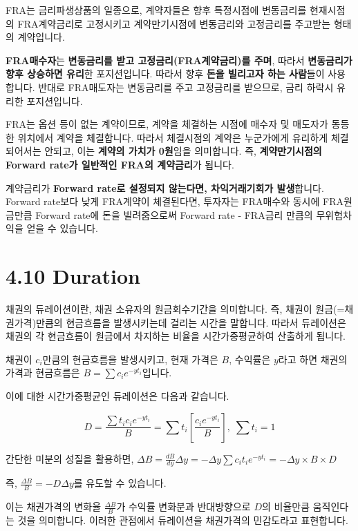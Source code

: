 \documentclass[
  letterpaper,
  DIV=11,
  numbers=noendperiod]{scrreprt}
\begin{document}

FRA는 금리파생상품의 일종으로, 계약자들은 향후 특정시점에 변동금리를
현재시점의 FRA계약금리로 고정시키고 계약만기시점에 변동금리와 고정금리를
주고받는 형태의 계약입니다.

\textbf{FRA매수자}는 \textbf{변동금리를 받고 고정금리(FRA계약금리)를
주며}, 따라서 \textbf{변동금리가 향후 상승하면 유리}한 포지션입니다.
따라서 향후 \textbf{돈을 빌리고자 하는 사람}들이 사용합니다. 반대로
FRA매도자는 변동금리를 주고 고정금리를 받으므로, 금리 하락시 유리한
포지션입니다.

FRA는 옵션 등이 없는 계약이므로, 계약을 체결하는 시점에 매수자 및
매도자가 동등한 위치에서 계약을 체결합니다. 따라서 체결시점의 계약은
누군가에게 유리하게 체결되어서는 안되고, 이는 \textbf{계약의 가치가
0원}임을 의미합니다. 즉, \textbf{계약만기시점의 Forward rate가 일반적인
FRA의 계약금리}가 됩니다.

계약금리가 \textbf{Forward rate로 설정되지 않는다면, 차익거래기회가
발생}합니다. Forward rate보다 낮게 FRA계약이 체결된다면, 투자자는
FRA매수와 동시에 FRA원금만큼 Forward rate에 돈을 빌려줌으로써 Forward
rate - FRA금리 만큼의 무위험차익을 얻을 수 있습니다.

\section*{4.10 Duration}\label{duration}


채권의 듀레이션이란, 채권 소유자의 원금회수기간을 의미합니다. 즉, 채권이
원금(=채권가격)만큼의 현금흐름을 발생시키는데 걸리는 시간을 말합니다.
따라서 듀레이션은 채권의 각 현금흐름이 원금에서 차지하는 비율을
시간가중평균하여 산출하게 됩니다.

채권이 \(c_i\)만큼의 현금흐름을 발생시키고, 현재 가격은 \(B\), 수익률은
\(y\)라고 하면 채권의 가격과 현금흐름은 \(B=\sum c_ie^{-yt_i}\)입니다.

이에 대한 시간가중평균인 듀레이션은 다음과 같습니다.

\[D=\frac{\sum t_ic_ie^{-yt_i}}{B}=\sum t_i[\frac{c_ie^{-yt_i}}{B}],\; \sum t_i=1\]

간단한 미분의 성질을 활용하면,
\(\Delta B=\frac{dB}{dy}\Delta y=-\Delta y \sum c_it_ie^{-yt_i}=-\Delta y\times B\times D\)

즉, \(\frac{\Delta B}{B}=-D\Delta y\)를 유도할 수 있습니다.

이는 채권가격의 변화율 \(\frac{\Delta B}{B}\)가 수익률 변화분과
반대방향으로 \(D\)의 비율만큼 움직인다는 것을 의미합니다. 이러한
관점에서 듀레이션을 채권가격의 민감도라고 표현합니다.
\end{document}
